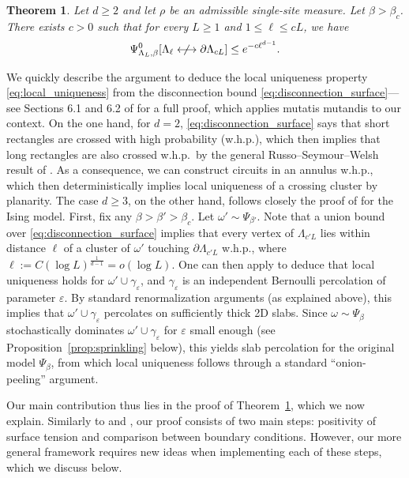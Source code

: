 \documentclass[11pt,a4paper]{article}
\renewcommand{\epsilon}{\varepsilon}
\numberwithin{equation}{section}
\theoremstyle{plain}
\newtheorem{Thm}{Theorem}[section]
\theoremstyle{definition}
\begin{document}
\begin{Thm}\label{thm:sharpness} Let $d\geq2$ and let $\rho$ be an admissible single-site measure. Let $\beta>\beta_c$. There exists $c>0$ such that for every $L\geq 1$ and $1\leq \ell\leq cL$, we have
\begin{equation}\label{eq:disconnection_surface}
        \Psi^0_{\Lambda_{L},\beta}[\Lambda_\ell \centernot\longleftrightarrow \partial \Lambda_{cL}]\leq e^{-c\ell^{d-1}}.
    \end{equation}
\end{Thm}

We quickly describe the argument to deduce the local uniqueness property \eqref{eq:local_uniqueness} from the disconnection bound \eqref{eq:disconnection_surface}---see Sections 6.1 and 6.2 of \cite{gunaratnam2025supercritical} for a full proof, which applies mutatis mutandis to our context. 
On the one hand, for $d=2$, \eqref{eq:disconnection_surface} says that short rectangles are crossed with high probability (w.h.p.), which then implies that long rectangles are also crossed w.h.p.~by the general Russo--Seymour--Welsh result of \cite{KohlerTassionGeneralRSW}. As a consequence, we can construct circuits in an annulus w.h.p., which then deterministically implies local uniqueness of a crossing cluster by planarity. The case $d\geq3$, on the other hand, follows closely the proof of \cite{SeveroSlabIsing2023} for the Ising model. First, fix any $\beta>\beta'>\beta_c$. Let $\omega'\sim \Psi_{\beta'}$. Note that a union bound over \eqref{eq:disconnection_surface} implies that every vertex of $\Lambda_{c'L}$ lies within distance $\ell$ of a cluster of $\omega'$ touching $\partial\Lambda_{c'L}$ w.h.p., where $\ell:=C(\log L)^{\frac{1}{d-1}} = o(\log L)$. One can then apply \cite[Proposition 6.2]{gunaratnam2025supercritical} to deduce that local uniqueness holds for $\omega'\cup \gamma_\epsilon$, and $ \gamma_\varepsilon$ is an independent Bernoulli percolation of parameter $\varepsilon$. By standard renormalization arguments (as explained above), this implies that $\omega'\cup\gamma_\varepsilon$ percolates on sufficiently thick 2D slabs. Since $\omega\sim\Psi_{\beta}$ stochastically dominates $\omega'\cup \gamma_\varepsilon$ for $\varepsilon$ small enough (see Proposition~\ref{prop:sprinkling} below), this yields slab percolation for the original model $\Psi_{\beta}$, from which local uniqueness follows through a standard ``onion-peeling'' argument.

Our main contribution thus lies in the proof of Theorem~\ref{thm:sharpness}, which we now explain. Similarly to \cite{Bod05} and \cite{gunaratnam2025supercritical}, our proof consists of two main steps: positivity of surface tension and comparison between boundary conditions.  However, our more general framework requires new ideas when implementing each of these steps, which we discuss below.
\end{document}
